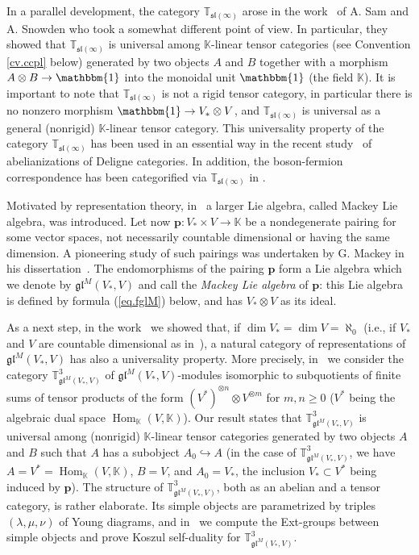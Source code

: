 \documentclass[11pt]{article}
\theoremstyle{plain}
\theoremstyle{nonumberplain}
\theoremstyle{plain}
\theoremstyle{nonumberplain}
\newcommand\bT{\mathbb T}
\newcommand\fgl{\mathfrak{gl}}
\newcommand\fsl{\mathfrak{sl}}
\DeclareMathOperator{\Hom}{\mathrm{Hom}}
\begin{document}
In a parallel development, the category $\mathbb{T}_{\fsl(\infty)}$ arose in the work~\cite{SS} of A. Sam and A. Snowden who took a somewhat different point of view.  In particular, they showed that $\mathbb{T}_{\fsl(\infty)}$ is universal among $\mathbb{K}$-linear tensor categories (see Convention \ref{cv.ccpl} below) generated by two objects $A$ and $B$ together with a morphism $A\otimes B\to\mathbbm{1}$ into the monoidal unit $\mathbbm{1}$ (the field $\mathbb{K}$).  It is important to note that $\mathbb{T}_{\fsl(\infty)}$ is not a rigid tensor category, in particular there is no nonzero morphism $\mathbbm{1}\to V_*\otimes V$, and $\mathbb{T}_{\fsl(\infty)}$ is universal as a general (nonrigid) $\mathbb{K}$-linear tensor category.  This universality property of the category $\mathbb{T}_{\fsl(\infty)}$ has been used in an essential way in the recent study~\cite{EHS} of abelianizations of Deligne categories.  In addition, the boson-fermion correspondence has been categorified via $\bT_{\fsl(\infty)}$ in \cite{FSP}.

Motivated by representation theory, in~\cite{PS2} a larger Lie
algebra, called Mackey Lie algebra, was introduced.  Let now
$\mathbf{p}:V_*\times V\to\mathbb{K}$ be a nondegenerate pairing for
some vector spaces, not necessarily countable dimensional or having
the same dimension.  A pioneering study of such pairings was
undertaken by G. Mackey in his dissertation~\cite{M}.  The
endomorphisms of the pairing $\mathbf{p}$ form a Lie algebra which we
denote by $\fgl^M(V_*,V)$ and call the \emph{Mackey Lie algebra} of
$\mathbf{p}$: this Lie algebra is defined by formula (\ref{eq.fglM})
below, and has $V_*\otimes V$ as its ideal.

As a next step, in the work~\cite{us2} we showed that, if
$\dim V_*=\dim V=\aleph_0$ (i.e., if $V_*$ and $V$ are countable
dimensional as in~\cite{DPS}), a natural category of representations
of $\fgl^M(V_*,V)$ has also a universality property.  More precisely,
in~\cite{us2} we consider the category $\mathbb{T}^3_{\fgl^M(V_*,V)}$
of $\fgl^M(V_*,V)$-modules isomorphic to subquotients of finite sums
of tensor products of the form
$\left(V^*\right)^{\otimes n}\otimes V^{\otimes m}$ for $m,n\geq 0$
($V^*$ being the algebraic dual space $\Hom_\mathbb{K}(V,\mathbb{K})$).  Our
result states that $\mathbb{T}^3_{\fgl^M(V_*,V)}$ is universal among (nonrigid) $\mathbb{K}$-linear tensor categories generated
by two objects $A$ and $B$ such that $A$ has a subobject
$A_0\hookrightarrow A$ (in the case of $\mathbb{T}^3_{\fgl^M(V_*,V)}$,
we have $A=V^*=\Hom_\mathbb{K}(V,\mathbb{K})$, $B=V$, and $A_0=V_*$, the
inclusion $V_*\subset V^*$ being induced by $\mathbf{p}$).  The
structure of $\mathbb{T}^3_{\fgl^M(V_*,V)}$, both as an abelian and a
tensor category, is rather elaborate.  Its simple objects are
parametrized by triples $(\lambda,\mu,\nu)$ of Young diagrams, and
in~\cite{us2} we compute the Ext-groups between simple objects and
prove Koszul self-duality for $\mathbb{T}^3_{\fgl^M(V_*,V)}$.
\end{document}
